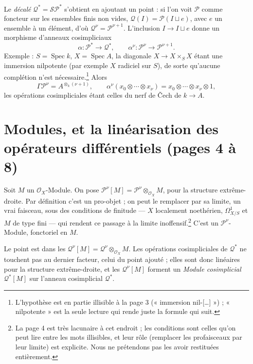 \documentclass[11pt,a4paper]{article}
\begin{document}
Le \emph{décalé} $\mathcal{Q}^{*} = \mathcal{S}\mathcal{P}^{*}$ s'obtient en
ajoutant un point : si l'on voit $\mathcal{P}$ comme foncteur sur les
ensembles finis non vides, $\mathcal{Q}(I) = \mathcal{P}(I \sqcup e)$, avec
$e$ un ensemble à un élément, d'où $\mathcal{Q}^{\nu} = \mathcal{P}^{\nu+1}$.
L'inclusion $I \to I \sqcup e$ donne un morphisme d'anneaux cosimpliciaux
\[
  \alpha : \mathcal{P}^{*} \longrightarrow \mathcal{Q}^{*} ,
  \qquad \alpha^{\nu} : \mathcal{P}^{\nu} \to \mathcal{P}^{\nu+1} .
\]
Exemple : $S = \operatorname{Spec} k$, $X = \operatorname{Spec} A$, la
diagonale $X \to X \times_S X$ étant une immersion nilpotente (par exemple
$X$ radiciel sur $S$), de sorte qu'aucune complétion n'est
nécessaire.\footnote{L'hypothèse est en partie illisible à la page 3
(« immersion nil-[\ldots] ») ; « nilpotente » est la seule lecture qui rende
juste la formule qui suit.} Alors
\[
  \Gamma \mathcal{P}^{\nu} = A^{\otimes_k (\nu+1)} ,
  \qquad
  \alpha^{\nu}(x_0 \otimes \cdots \otimes x_\nu)
  = x_0 \otimes \cdots \otimes x_\nu \otimes 1 ,
\]
les opérations cosimpliciales étant celles du nerf de Čech de $k \to A$.

\section*{Modules, et la linéarisation des opérateurs différentiels (pages 4 à 8)}

Soit $M$ un $\mathcal{O}_X$-Module. On pose $\mathcal{P}^{\nu}[M] =
\mathcal{P}^{\nu} \otimes_{\mathcal{O}_X} M$, pour la structure
extrême-droite. Par définition c'est un pro-objet ; on peut le remplacer par
sa limite, un vrai faisceau, sous des conditions de finitude — $X$ localement
noethérien, $\Omega^{1}_{X/S}$ et $M$ de type fini — qui rendent ce passage à
la limite inoffensif.\footnote{La page 4 est très lacunaire à cet endroit ;
les conditions sont celles qu'on peut lire entre les mots illisibles, et
leur rôle (remplacer les profaisceaux par leur limite) est explicite. Nous ne
prétendons pas les avoir restituées entièrement.} C'est un
$\mathcal{P}^{\nu}$-Module, fonctoriel en $M$.

Le point est dans les $\mathcal{Q}^{\nu}[M] = \mathcal{Q}^{\nu}
\otimes_{\mathcal{O}_X} M$. Les opérations cosimpliciales de $\mathcal{Q}^{*}$
ne touchent pas au dernier facteur, celui du point ajouté ; elles sont donc
linéaires pour la structure extrême-droite, et les $\mathcal{Q}^{\nu}[M]$
forment un \emph{Module cosimplicial} $\mathcal{Q}^{*}[M]$ sur l'anneau
cosimplicial $\mathcal{Q}^{*}$.
\end{document}
